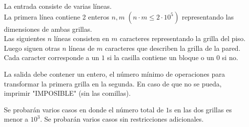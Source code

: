 \documentclass{oci}
\begin{document}
\begin{inputDescription}
La entrada consiste de varias líneas.\\
La primera línea contiene 2 enteros $n, m$ $(n \cdot m \leq 2 \cdot 10^5)$ representando las dimensiones de ambas grillas.\\

Las siguientes $n$ líneas consisten en $m$ caracteres representando la grilla del piso.\\

Luego siguen otras $n$ líneas de $m$ caracteres que describen la grilla de la pared.\\

Cada caracter corresponde a un $1$ si la casilla contiene un bloque o un $0$ si no.
\end{inputDescription}

\begin{outputDescription}
La salida debe contener un entero, el número mínimo de operaciones para transformar la primera grilla en la segunda. En caso de que no se pueda, imprimir "IMPOSIBLE" (sin las comillas).
\end{outputDescription}

\begin{scoreDescription}
  Se probarán varios casos en donde el número total de $1$s en las dos grillas es menor a $10^3$.
  Se probarán varios casos sin restricciones adicionales.
\end{scoreDescription}

\begin{sampleDescription}
\end{sampleDescription}
\end{document}
